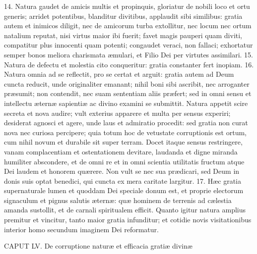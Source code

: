 14. Natura gaudet de amicis multis et propinquis, gloriatur de nobili loco et ortu generis; arridet potentibus, blanditur divitibus, applaudit sibi similibus: gratia autem et inimicos diligit, nec de amicorum turba extollitur, nec locum nec ortum natalium reputat, nisi virtus maior ibi fuerit; favet magis pauperi quam diviti, compatitur plus innocenti quam potenti; congaudet veraci, non fallaci; exhortatur semper bonos meliora charismata æmulari, et Filio Dei per virtutes assimilari.
15. Natura de defectu et molestia cito conqueritur: gratia constanter fert inopiam.
16. Natura omnia ad se reflectit, pro se certat et arguit: gratia autem ad Deum cuncta reducit, unde originaliter emanant; nihil boni sibi ascribit, nec arroganter præsumit; non contendit, nec suam sententiam aliis præfert; sed in omni sensu et intellectu æternæ sapientiæ ac divino examini se submittit. Natura appetit scire secreta et nova audire; vult exterius apparere et multa per sensus experiri; desiderat agnosci et agere, unde laus et admiratio procedit: sed gratia non curat nova nec curiosa percipere; quia totum hoc de vetustate corruptionis est ortum, cum nihil novum et durabile sit super terram. Docet itaque sensus restringere, vanam complacentiam et ostentationem devitare, laudanda et digne miranda humiliter abscondere, et de omni re et in omni scientia utilitatis fructum atque Dei laudem et honorem quærere. Non vult se nec sua prædicari, sed Deum in donis suis optat benedici, qui cuncta ex mera caritate largitur.
17. Hæc gratia supernaturale lumen et quoddam Dei speciale donum est, et proprie electorum signaculum et pignus salutis æternæ: quæ hominem de terrenis ad cælestia amanda sustollit, et de carnali spiritualem efficit. Quanto igitur natura amplius premitur et vincitur, tanto maior gratia infunditur; et cotidie novis visitationibus interior homo secundum imaginem Dei reformatur.


CAPUT LV.
De corruptione naturæ et efficacia gratiæ divinæ

